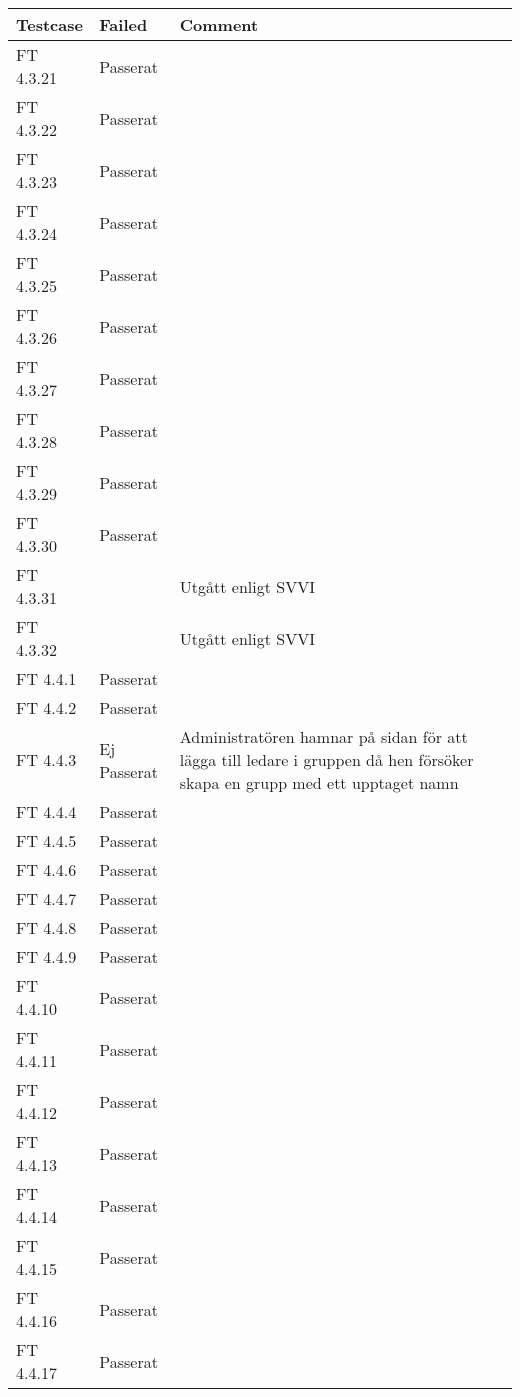 \documentclass[a4paper]{article}
\begin{document}
\begin{tabular}{| l | l | p{11cm} |}
\hline
Testcase &  Failed & Comment\\
\hline
FT 4.3.21 & Passerat & \\
\hline
FT 4.3.22 & Passerat & \\
\hline
FT 4.3.23 & Passerat & \\
\hline
FT 4.3.24 & Passerat & \\
\hline
FT 4.3.25 & Passerat & \\
\hline
FT 4.3.26 & Passerat & \\
\hline
FT 4.3.27 & Passerat & \\
\hline
FT 4.3.28 & Passerat & \\
\hline
FT 4.3.29 & Passerat & \\
\hline
FT 4.3.30 & Passerat & \\
\hline
FT 4.3.31 & & Utgått enligt SVVI\\
\hline
FT 4.3.32 & & Utgått enligt SVVI\\
\hline
FT 4.4.1 & Passerat & \\
\hline
FT 4.4.2 & Passerat & \\
\hline
FT 4.4.3 & Ej Passerat & Administratören hamnar på sidan för att lägga till ledare i gruppen då hen försöker skapa en grupp med ett upptaget namn\\
\hline
FT 4.4.4 & Passerat & \\
\hline
FT 4.4.5 & Passerat & \\
\hline
FT 4.4.6 & Passerat & \\
\hline
FT 4.4.7 & Passerat & \\
\hline
FT 4.4.8 & Passerat & \\
\hline
FT 4.4.9 & Passerat & \\
\hline
FT 4.4.10 & Passerat & \\
\hline
FT 4.4.11 & Passerat & \\
\hline
FT 4.4.12 & Passerat & \\
\hline
FT 4.4.13 & Passerat & \\
\hline
FT 4.4.14 & Passerat & \\
\hline
FT 4.4.15 & Passerat & \\
\hline
FT 4.4.16 & Passerat & \\
\hline
FT 4.4.17 & Passerat & \\
\hline
\end{tabular}
\end{document}
